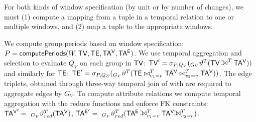 
For both kinds of window specification (by unit or by number of
changes), we must (1) compute a mapping from a tuple in a temporal
relation to one or multiple windows, and (2) map a tuple to the
appropriate windows.

 We compute group periods based on window
specification: $P = \textsf{computePeriods}(W, \textsf{TV}, \textsf{TE}, \mathsf{TA^{V}}, \mathsf{TA^{E}})$.
We use temporal aggregation and selection to evaluate $Q_V$ on each
group in $\textsf{TV}$: $\tv' = \sigma_{P,Q_V}( _{G_V}\vartheta^T (\tv
\leftouterjoin^T \tav))$ and similarly for $\textsf{TE}$: $\textsf{TE}' =
\sigma_{P,Q_E}( _{G_V}\vartheta^T (\textsf{TE} \bowtie^T_{v_1=v} \mathsf{TA^{V}}
\bowtie^T_{v_2=v} \mathsf{TA^{V}}))$.  The edge triplets, obtained through
three-way temporal join of \tae with \tav are required to aggregate
edges by $G_V$.  To compute attribute relations we compute temporal
aggregation with the reduce functions and enforce FK constraints:
$\mathsf{TA^{V}}' = ~_{G_V}\vartheta^T_{red}(\mathsf{TA^{V}})$, $\tae' =
~_{G_V}\vartheta^T_{red}(\tae \leftouterjoin^T_{v_1=v} \tav
\leftouterjoin^T_{v_2=v})$.



